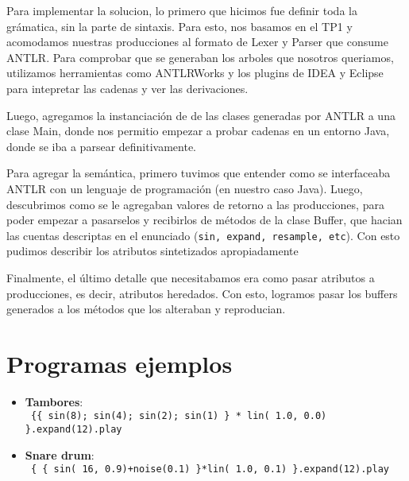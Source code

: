 \documentclass[a4paper]{article}
\begin{document}
Para implementar la solucion, lo primero que hicimos fue definir toda la
gr\'amatica, sin la parte de sintaxis. Para esto, nos basamos en el TP1 y
acomodamos nuestras producciones al formato de Lexer y Parser que consume ANTLR.
Para comprobar que se generaban los arboles que nosotros queriamos, utilizamos
herramientas como ANTLRWorks y los plugins de IDEA y Eclipse para intepretar 
las cadenas y ver las derivaciones. 

Luego, agregamos la instanciaci\'on de de las clases generadas por ANTLR
a una clase Main, donde nos permitio empezar a probar cadenas en un 
entorno Java, donde se iba a parsear definitivamente.

Para agregar la sem\'antica, primero tuvimos que entender como se interfaceaba
ANTLR con un lenguaje de programaci\'on (en nuestro caso Java). Luego, descubrimos
como se le agregaban valores de retorno a las producciones, para poder empezar
a pasarselos y recibirlos de m\'etodos de la clase Buffer, que hacian las cuentas
descriptas en el enunciado (\texttt{sin, expand, resample, etc}). Con esto
pudimos describir los atributos sintetizados apropiadamente

Finalmente, el \'ultimo detalle que necesitabamos era como pasar atributos a
producciones, es decir, atributos heredados. Con esto, logramos pasar
los buffers generados a los m\'etodos que los alteraban y reproducian.

\section{Programas ejemplos}
\begin{itemize}
    \item \textbf{Tambores}:\\
        \hbox{\texttt{ \{\{ sin(8); sin(4); sin(2); sin(1) \} * lin( 1.0, 0.0) \}.expand(12).play }}
    \item \textbf{Snare drum}:\\
        \hbox{\texttt{ \{ \{ sin( 16, 0.9)+noise(0.1) \}*lin( 1.0, 0.1) \}.expand(12).play  }}
\end{itemize}
\end{document}

